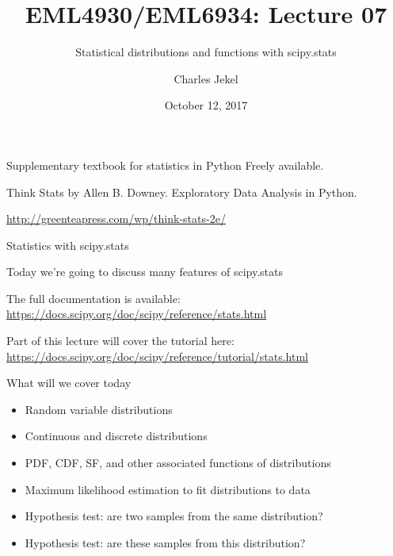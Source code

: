 \documentclass[10pt]{beamer}
\title{EML4930/EML6934: Lecture 07}
\subtitle{Statistical distributions and functions with scipy.stats }
\date{October 12, 2017}
\author{Charles Jekel}
\begin{document}
\maketitle

\begin{frame}{Supplementary textbook for statistics in Python}
Freely available.

Think Stats by Allen B. Downey.
Exploratory Data Analysis in Python.

\url{http://greenteapress.com/wp/think-stats-2e/}
\end{frame}

\begin{frame}{Statistics with scipy.stats}

Today we're going to discuss many features of scipy.stats

The full documentation is available:
\url{https://docs.scipy.org/doc/scipy/reference/stats.html}

Part of this lecture will cover the tutorial here:
\url{https://docs.scipy.org/doc/scipy/reference/tutorial/stats.html}
\end{frame}

\begin{frame}{What will we cover today}
\begin{itemize}
\item Random variable distributions
\item Continuous and discrete distributions
\item PDF, CDF, SF, and other associated functions of distributions
\item Maximum likelihood estimation to fit distributions to data
\item Hypothesis test: are two samples from the same distribution?
\item Hypothesis test: are these samples from this distribution?
\end{itemize}
\end{frame}

\end{document}
